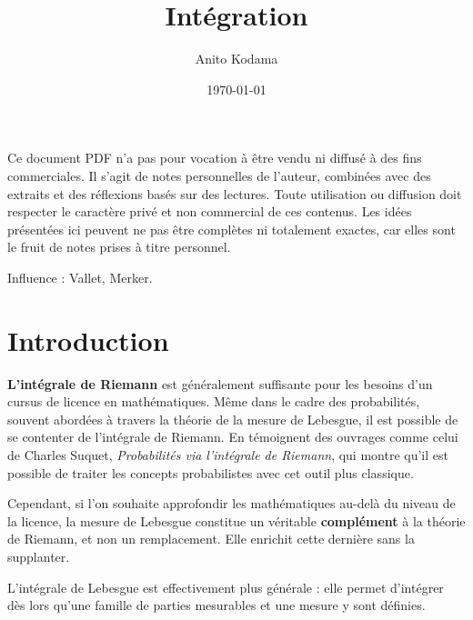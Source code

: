 
\usepackage{pgfplots}
\usepackage{setspace}
\usepackage{emoji}

\title{Intégration}

\author{Anito Kodama}

\date{\today}



\onehalfspacing %

\maketitle

\begin{center}
\begin{minipage}{0.9\textwidth}
\small\ttfamily
Ce document PDF n'a pas pour vocation à être vendu ni diffusé à des fins commerciales. Il s'agit de notes personnelles de l'auteur, combinées avec des extraits et des réflexions basés sur des lectures. Toute utilisation ou diffusion doit respecter le caractère privé et non commercial de ces contenus. Les idées présentées ici peuvent ne pas être complètes ni totalement exactes, car elles sont le fruit de notes prises à titre personnel.

Influence : Vallet, Merker.
\end{minipage}
\end{center}

\section{Introduction}
\textbf{L'intégrale de Riemann} est généralement suffisante pour les besoins d'un cursus de licence en mathématiques. Même dans le cadre des probabilités, souvent abordées à travers la théorie de la mesure de Lebesgue, il est possible de se contenter de l'intégrale de Riemann. En témoignent des ouvrages comme celui de Charles Suquet, \textit{Probabilités via l'intégrale de Riemann}, qui montre qu'il est possible de traiter les concepts probabilistes avec cet outil plus classique.

Cependant, si l'on souhaite approfondir les mathématiques au-delà du niveau de la licence, la mesure de Lebesgue constitue un véritable \textbf{complément} à la théorie de Riemann, et non un remplacement. Elle enrichit cette dernière sans la supplanter.

L'intégrale de Lebesgue est effectivement plus générale : elle permet d'intégrer dès lors qu'une famille de parties mesurables et une mesure y sont définies.

